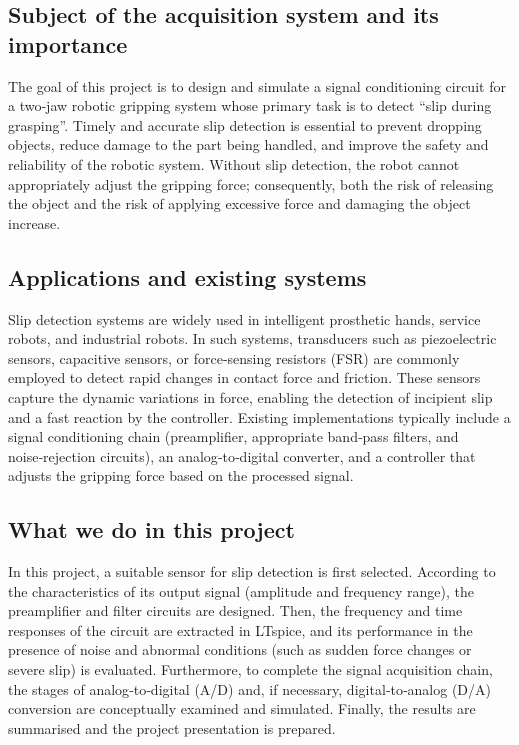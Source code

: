 \documentclass[12pt,a4paper]{article}
\begin{document}
\subsection*{Subject of the acquisition system and its importance}
The goal of this project is to design and simulate a signal conditioning circuit for a two‑jaw robotic gripping system whose primary task is to detect “slip during grasping”. Timely and accurate slip detection is essential to prevent dropping objects, reduce damage to the part being handled, and improve the safety and reliability of the robotic system. Without slip detection, the robot cannot appropriately adjust the gripping force; consequently, both the risk of releasing the object and the risk of applying excessive force and damaging the object increase.

\subsection*{Applications and existing systems}
Slip detection systems are widely used in intelligent prosthetic hands, service robots, and industrial robots. In such systems, transducers such as piezoelectric sensors, capacitive sensors, or force‑sensing resistors (FSR) are commonly employed to detect rapid changes in contact force and friction. These sensors capture the dynamic variations in force, enabling the detection of incipient slip and a fast reaction by the controller. Existing implementations typically include a signal conditioning chain (preamplifier, appropriate band‑pass filters, and noise‑rejection circuits), an analog‑to‑digital converter, and a controller that adjusts the gripping force based on the processed signal.

\subsection*{What we do in this project}
In this project, a suitable sensor for slip detection is first selected. According to the characteristics of its output signal (amplitude and frequency range), the preamplifier and filter circuits are designed. Then, the frequency and time responses of the circuit are extracted in LTspice, and its performance in the presence of noise and abnormal conditions (such as sudden force changes or severe slip) is evaluated. Furthermore, to complete the signal acquisition chain, the stages of analog‑to‑digital (A/D) and, if necessary, digital‑to‑analog (D/A) conversion are conceptually examined and simulated. Finally, the results are summarised and the project presentation is prepared.
\end{document}
